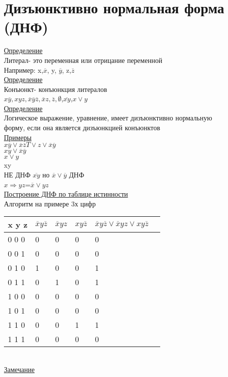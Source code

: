 \documentclass{article}
\begin{document}
\section{Дизъюнктивно нормальная форма (ДНФ)}
\underline{Определение}\\
Литерал- это переменная или отрицание переменной\\
Например: x,$\overline{x}$, y, $\overline{y}$, z,$\overline{z}$\\
\underline{Определение}\\
Конъюнкт- конъюнкция литералов\\
$x\overline{y},xyz,\overline{x}\overline{y}\overline{z},\overline{x}z,\overline{z},\emptyset$,\sout{$\overline{xy}$},\sout{$x\vee y$}\\
\underline{Определение}\\
Логическое выражение, уравнение, имеет дизъюнктивно нормальную\\
форму, если она является дизъюнкцией конъюнктов\\
\underline{Примеры}\\
$x\overline{y} \vee \overline{x}\overline{z}T\vee z\vee \overline{x}\overline{y}$\\
$xy\vee \overline{x}\overline{y}$\\
$x\vee y$\\
xy\\
НЕ ДНФ \sout{$\overline{xy}$} но $\overline{x}\vee\overline{y}$ ДНФ\\
\sout{$x\Rightarrow yz$}=$\overline{x}\vee yz$\\
\underline{Построение ДНФ по таблице истинности}\\
Алгоритм на примере 3х цифр\\
\begin{tabular}{l|l|l|l|l|l}
x y z&$\overline{x }y\overline{z}$&$\overline{x}yz$&$xy\overline{z}$&$\overline{x }y\overline{z}\vee \overline{x}yz\vee xy\overline{z}$\\
\hline
0 0 0&0&0&0&0\\
0 0 1&0&0&0&0\\
0 1 0&1&0&0&1\\
0 1 1&0&1&0&1\\
1 0 0&0&0&0&0\\
1 0 1&0&0&0&0\\
1 1 0&0&0&1&1\\
1 1 1&0&0&0&0\\
\end{tabular}\\
\underline{Замечание}\\
\end{document}
